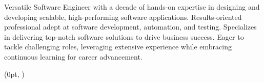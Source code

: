 \documentclass[11pt, a4paper]{resume}
\begin{document}
\makecvheader %

\begin{cvsummary}
    Versatile Software Engineer with a decade of hands-on expertise in designing and developing scalable, high-performing software applications.
    Results-oriented professional adept at software development, automation, and testing.
    Specializes in delivering top-notch software solutions to drive business success.
    Eager to tackle challenging roles, leveraging extensive experience while embracing continuous learning for career advancement.
\end{cvsummary}



\setlength{\headersmargin}{-0.2cm}
\setlength{\leftcolumnwidth}{5cm}
\setlength{\columnsmargin}{0.5\sidemargin}
\setlength{\timelinemargin}{0.5cm}


\begin{textblock*}{\leftcolumnwidth}(0pt, \headersmargin)
    \vspace{-2mm}
    
    \vspace{3mm}
    
    \vspace{3.5mm}
    
    
\end{textblock*}
\end{document}
